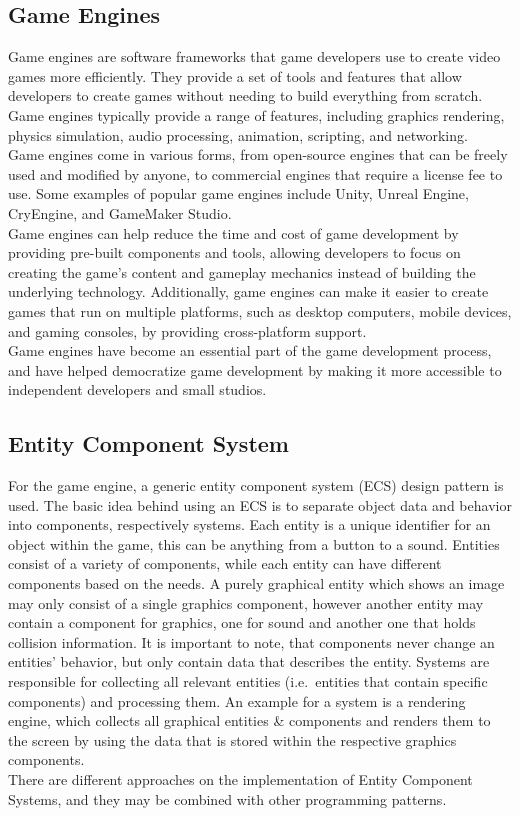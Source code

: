 \subsection{Game Engines}\label{subsec:game-engines}
Game engines are software frameworks that game developers use to create video games more efficiently.
They provide a set of tools and features that allow developers to create games without needing to build everything from scratch.
Game engines typically provide a range of features, including graphics rendering, physics simulation, audio processing, animation, scripting, and networking.
\\
Game engines come in various forms, from open-source engines that can be freely used and modified by anyone, to commercial engines that require a license fee to use.
Some examples of popular game engines include Unity, Unreal Engine, CryEngine, and GameMaker Studio.
\\
Game engines can help reduce the time and cost of game development by providing pre-built components and tools, allowing developers to focus on creating the game's content and gameplay mechanics instead of building the underlying technology.
Additionally, game engines can make it easier to create games that run on multiple platforms, such as desktop computers, mobile devices, and gaming consoles, by providing cross-platform support.
\\
Game engines have become an essential part of the game development process, and have helped democratize game development by making it more accessible to independent developers and small studios.


\subsection{Entity Component System}\label{subsec:entity-component-system}
For the game engine, a generic entity component system (ECS) design pattern is used.
The basic idea behind using an ECS is to separate object data and behavior into components, respectively systems.
Each entity is a unique identifier for an object within the game, this can be anything from a button to a sound.
Entities consist of a variety of components, while each entity can have different components based on the needs.
A purely graphical entity which shows an image may only consist of a single graphics component, however another entity may contain
a component for graphics, one for sound and another one that holds collision information.
It is important to note, that components never change an entities' behavior, but only contain data that describes the entity.
Systems are responsible for collecting all relevant entities (i.e.\ entities that contain specific components) and processing them.
An example for a system is a rendering engine, which collects all graphical entities \& components and renders them to the screen by
using the data that is stored within the respective graphics components.
\\
There are different approaches on the implementation of Entity Component Systems, and they may be combined with other programming
patterns.
